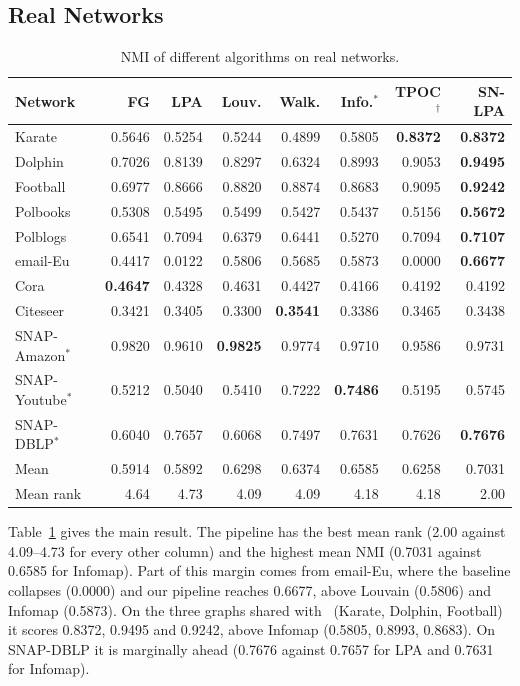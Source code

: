 \documentclass[conference]{IEEEtran}
\begin{document}
\subsection{Real Networks}
\begin{table}[t]
\centering
\caption{NMI of different algorithms on real networks.}
\label{tab:real}
\scriptsize
\begin{tabular}{lrrrrrrr}
\toprule
Network & FG & LPA & Louv. & Walk. & Info.$^{*}$ & TPOC$^{\dagger}$ & SN-LPA \\
\midrule
Karate & 0.5646 & 0.5254 & 0.5244 & 0.4899 & 0.5805 & \textbf{0.8372} & \textbf{0.8372} \\
Dolphin & 0.7026 & 0.8139 & 0.8297 & 0.6324 & 0.8993 & 0.9053 & \textbf{0.9495} \\
Football & 0.6977 & 0.8666 & 0.8820 & 0.8874 & 0.8683 & 0.9095 & \textbf{0.9242} \\
Polbooks & 0.5308 & 0.5495 & 0.5499 & 0.5427 & 0.5437 & 0.5156 & \textbf{0.5672} \\
Polblogs & 0.6541 & 0.7094 & 0.6379 & 0.6441 & 0.5270 & 0.7094 & \textbf{0.7107} \\
email-Eu & 0.4417 & 0.0122 & 0.5806 & 0.5685 & 0.5873 & 0.0000 & \textbf{0.6677} \\
Cora & \textbf{0.4647} & 0.4328 & 0.4631 & 0.4427 & 0.4166 & 0.4192 & 0.4192 \\
Citeseer & 0.3421 & 0.3405 & 0.3300 & \textbf{0.3541} & 0.3386 & 0.3465 & 0.3438 \\
SNAP-Amazon$^{*}$ & 0.9820 & 0.9610 & \textbf{0.9825} & 0.9774 & 0.9710 & 0.9586 & 0.9731 \\
SNAP-Youtube$^{*}$ & 0.5212 & 0.5040 & 0.5410 & 0.7222 & \textbf{0.7486} & 0.5195 & 0.5745 \\
SNAP-DBLP$^{*}$ & 0.6040 & 0.7657 & 0.6068 & 0.7497 & 0.7631 & 0.7626 & \textbf{0.7676} \\
\midrule
Mean & 0.5914 & 0.5892 & 0.6298 & 0.6374 & 0.6585 & 0.6258 & 0.7031 \\
Mean rank & 4.64 & 4.73 & 4.09 & 4.09 & 4.18 & 4.18 & 2.00 \\
\bottomrule
\end{tabular}
\end{table}
Table~\ref{tab:real} gives the main result. The pipeline has the best mean rank (2.00 against 4.09--4.73 for every other column) and the highest mean NMI (0.7031 against 0.6585 for Infomap). Part of this margin comes from email-Eu, where the baseline collapses (0.0000) and our pipeline reaches 0.6677, above Louvain (0.5806) and Infomap (0.5873). On the three graphs shared with~\cite{kong2026} (Karate, Dolphin, Football) it scores 0.8372, 0.9495 and 0.9242, above Infomap (0.5805, 0.8993, 0.8683). On SNAP-DBLP it is marginally ahead (0.7676 against 0.7657 for LPA and 0.7631 for Infomap).
\end{document}
